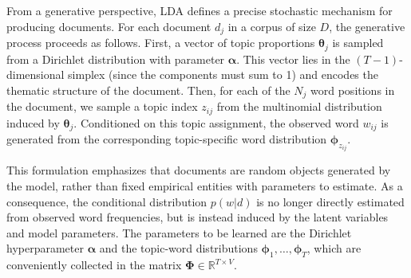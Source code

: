 \begin{figure}
\end{figure}

From a generative perspective, LDA defines a precise stochastic mechanism for producing documents. For each document $d_j$ in a corpus of size $D$, the generative process proceeds as follows. First, a vector of topic proportions $\boldsymbol{\theta}_j$ is sampled from a Dirichlet distribution with parameter $\boldsymbol{\alpha}$. This vector lies in the $(T-1)$-dimensional simplex (since the components must sum to 1) and encodes the thematic structure of the document. Then, for each of the $N_j$ word positions in the document, we sample a topic index $z_{ij}$ from the multinomial distribution induced by $\boldsymbol{\theta}_j$. Conditioned on this topic assignment, the observed word $w_{ij}$ is generated from the corresponding topic-specific word distribution $\boldsymbol{\phi}_{z_{ij}}$.

This formulation emphasizes that documents are random objects generated by the model, rather than fixed empirical entities with parameters to estimate. As a consequence, the conditional distribution $p(w | d)$ is no longer directly estimated from observed word frequencies, but is instead induced by the latent variables and model parameters. The parameters to be learned are the Dirichlet hyperparameter $\boldsymbol{\alpha}$ and the topic-word distributions $\boldsymbol{\phi}_1, \ldots, \boldsymbol{\phi}_T$, which are conveniently collected in the matrix $\boldsymbol{\Phi} \in \mathbb{R}^{T \times V}$.

